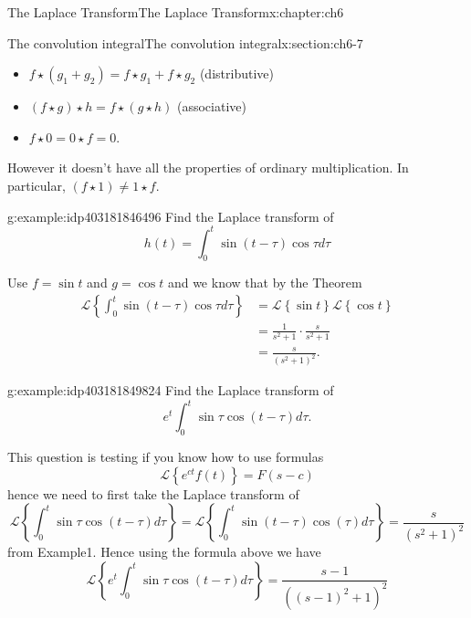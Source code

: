\documentclass[oneside,10pt,]{book}
\numberwithin{equation}{section}
\numberwithin{equation}{section}
\newcommand{\amp}{&}
\begin{document}
\begin{chapterptx}{The Laplace Transform}{}{The Laplace Transform}{}{}{x:chapter:ch6}
\begin{sectionptx}{The convolution integral}{}{The convolution integral}{}{}{x:section:ch6-7}
\begin{itemize}[label=\textbullet]
\item{}\(f\star\left(g_{1}+g_{2}\right)=f\star g_{1}+f\star g_{2}\) (distributive)%
\item{}\(\left(f\star g\right)\star h=f\star\left(g\star h\right)\) (associative)%
\item{}\(f\star0=0\star f=0\).%
\end{itemize}
However it doesn't have all the properties of ordinary multiplication. In particular, \(\left(f\star1\right)\neq1\star f\).%
\begin{example}{}{g:example:idp403181846496}%
Find the Laplace transform of%
\begin{equation*}
h(t)=\int_{0}^{t}\sin\left(t-\tau\right)\cos\tau d\tau
\end{equation*}
%
\par
Use \(f=\sin t\) and \(g=\cos t\) and we know that by the Theorem%
\begin{align*}
\mathcal{L}\left\{ \int_{0}^{t}\sin\left(t-\tau\right)\cos\tau d\tau\right\}  \amp =\mathcal{L}\left\{ \sin t\right\} \mathcal{L}\left\{ \cos t\right\} \\
\amp =\frac{1}{s^{2}+1}\cdot\frac{s}{s^{2}+1}\\
\amp =\frac{s}{(s^{2}+1)^{2}}.
\end{align*}
%
\end{example}
\begin{example}{}{g:example:idp403181849824}%
Find the Laplace transform of%
\begin{equation*}
e^{t}\int_{0}^{t}\sin\tau\cos\left(t-\tau\right)d\tau.
\end{equation*}
%
\par
This question is testing if you know how to use formulas%
\begin{equation*}
\mathcal{L}\left\{ e^{ct}f(t)\right\} =F(s-c)
\end{equation*}
hence we need to first take the Laplace transform of%
\begin{equation*}
\mathcal{L}\left\{ \int_{0}^{t}\sin\tau\cos\left(t-\tau\right)d\tau\right\} =\mathcal{L}\left\{ \int_{0}^{t}\sin\left(t-\tau\right)\cos\left(\tau\right)d\tau\right\} =\frac{s}{(s^{2}+1)^{2}}
\end{equation*}
from Example1. Hence using the formula above we have%
\begin{equation*}
\mathcal{L}\left\{ e^{t}\int_{0}^{t}\sin\tau\cos\left(t-\tau\right)d\tau\right\} =\frac{s-1}{\left(\left(s-1\right)^{2}+1\right)^{2}}
\end{equation*}
%
\end{example}

\end{sectionptx}
\end{chapterptx}
\end{document}

